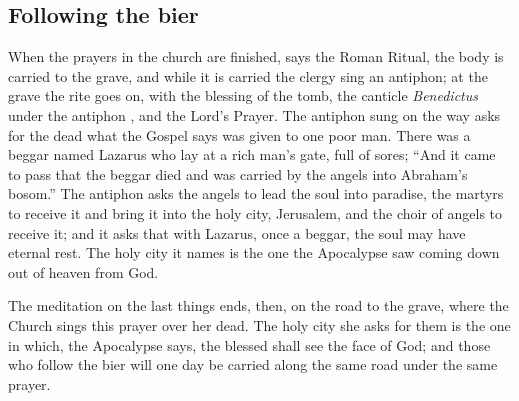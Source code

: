 \subsection{Following the bier}

When the prayers in the church are finished, says the Roman Ritual, the body is carried to the grave, and while it is carried the clergy sing an antiphon; at the grave the rite goes on, with the blessing of the tomb, the canticle \emph{Benedictus} under the antiphon , and the Lord's Prayer. The antiphon sung on the way asks for the dead what the Gospel says was given to one poor man. There was a beggar named Lazarus who lay at a rich man's gate, full of sores; ``And it came to pass that the beggar died and was carried by the angels into Abraham's bosom.'' The antiphon asks the angels to lead the soul into paradise, the martyrs to receive it and bring it into the holy city, Jerusalem, and the choir of angels to receive it; and it asks that with Lazarus, once a beggar, the soul may have eternal rest. The holy city it names is the one the Apocalypse saw coming down out of heaven from God.

The meditation on the last things ends, then, on the road to the grave, where the Church sings this prayer over her dead. The holy city she asks for them is the one in which, the Apocalypse says, the blessed shall see the face of God; and those who follow the bier will one day be carried along the same road under the same prayer.
